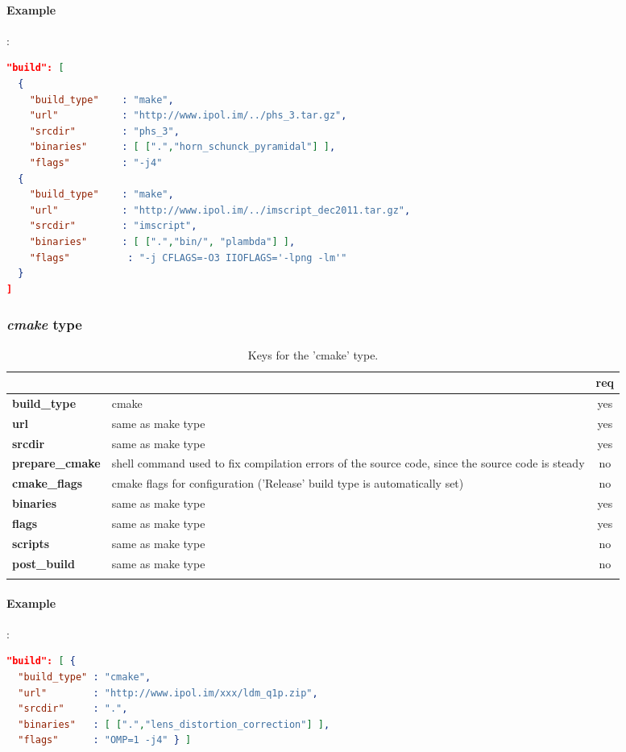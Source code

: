 \paragraph{Example}:\\
\begin{lstlisting}[language=json,firstnumber=1]
"build": [ 
  {
    "build_type"    : "make",
    "url"           : "http://www.ipol.im/../phs_3.tar.gz", 
    "srcdir"        : "phs_3",
    "binaries"      : [ [".","horn_schunck_pyramidal"] ],
    "flags"         : "-j4"
  {
    "build_type"    : "make",
    "url"           : "http://www.ipol.im/../imscript_dec2011.tar.gz", 
    "srcdir"        : "imscript",
    "binaries"      : [ [".","bin/", "plambda"] ],
    "flags"          : "-j CFLAGS=-O3 IIOFLAGS='-lpng -lm'"
  }
]
\end{lstlisting}

\subsubsection{\emph{cmake} type}

\begin{longtable}{|>{\bf}L{\linewidth}|L{\linewidth}|c|}
\hline
{}     &  & {\bf req} \tabularnewline 
\hline \hline
 build\_type  & cmake & yes \\ \hline
 url          & same as make type & yes \\ \hline
 srcdir       & same as make type & yes \\ \hline
 prepare\_cmake & shell command used to fix compilation errors of the source code,
                since the source code is steady & no  \\ \hline
 cmake\_flags  & cmake flags for configuration ('Release' build type is 
                automatically set) & no  \\ \hline
 binaries     & same as make type & yes \\ \hline
 flags        & same as make type & yes \\ \hline
 scripts      & same as make type & no  \\ \hline
 post\_build  & same as make type & no \\ \hline
\caption{Keys for the 'cmake' type.}
\end{longtable}

\paragraph{Example}:\\
\begin{lstlisting}[language=json,firstnumber=1]
"build": [ { 
  "build_type" : "cmake",
  "url"        : "http://www.ipol.im/xxx/ldm_q1p.zip", 
  "srcdir"     : ".",
  "binaries"   : [ [".","lens_distortion_correction"] ],
  "flags"      : "OMP=1 -j4" } ]
\end{lstlisting}

